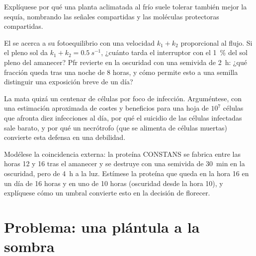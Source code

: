 \begin{exercise}[$\star\star$]\label{exo:b3:plant-molecular-physiology:9}
Explíquese por qué una planta aclimatada al frío suele tolerar también
mejor la sequía, nombrando las señales compartidas y las moléculas
protectoras compartidas.
\end{exercise}

\begin{exercise}[$\star\star\star$]\label{exo:b3:plant-molecular-physiology:10}
El  se acerca a su fotoequilibrio con una velocidad
$k_{1} + k_{2}$ proporcional al flujo. Si el pleno sol da $k_{1} + k_{2} =
\qty{0.5}{s^{-1}}$, ¿cuánto tarda el interruptor con el \qty{1}{\%} del
sol pleno del amanecer? Pfr revierte en la oscuridad con una semivida
de \qty{2}{h}: ¿qué fracción queda tras una noche de 8 horas, y cómo
permite esto a una semilla distinguir una exposición breve de un día?
\end{exercise}

\begin{exercise}[$\star\star\star$]\label{exo:b3:plant-molecular-physiology:11}
La  mata quizá un centenar de células por foco
de infección. Arguméntese, con una estimación aproximada de costes y
beneficios para una hoja de $10^{7}$ células que afronta diez
infecciones al día, por qué el suicidio de las células infectadas sale
barato, y por qué un necrótrofo (que se alimenta de células muertas)
convierte esta defensa en una debilidad.
\end{exercise}

\begin{exercise}[$\star\star\star$]\label{exo:b3:plant-molecular-physiology:12}
Modélese la coincidencia externa: la proteína CONSTANS se fabrica entre
las horas 12 y 16 tras el amanecer y se destruye con una semivida de
\qty{30}{min} en la oscuridad, pero de \qty{4}{h} a la luz. Estímese la
proteína que queda en la hora 16 en un día de 16 horas y en uno de 10
horas (oscuridad desde la hora 10), y explíquese cómo un umbral
convierte esto en la decisión de florecer.
\end{exercise}

\section{Problema: una plántula a la sombra}

